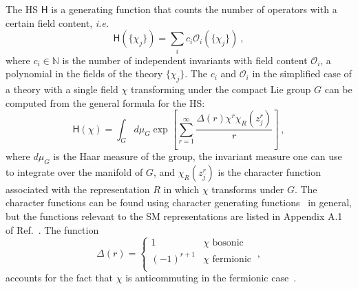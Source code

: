 The HS $\mathsf{H}$ is a generating function that counts the number of
operators with a certain field content, \textit{i.e.}
\begin{equation}
  \mathsf{H}(\{\chi_{j}\}) = \sum_{i} c_{i} \mathcal{O}_{i}(\{\chi_{j}\}) \ ,
\end{equation}
where $c_{i} \in \mathbb{N}$ is the number of independent invariants with field
content $\mathcal{O}_{i}$, a polynomial in the fields of the theory
$\{\chi_{j}\}$. The $c_{i}$ and $\mathcal{O}_{i}$ in the simplified case of a
theory with a single field $\chi$ transforming under the compact Lie group $G$
can be computed from the general formula for the HS:
\begin{equation}
  \label{eq:ch1-hs-g}
  \mathsf{H}(\chi) = \int_{G} d\mu_{G} \exp \left[ \sum_{r=1}^{\infty} \frac{\Delta(r) \chi^{r} \chi_{R}(z_{j}^{r})}{r} \right] \ ,
\end{equation}
where $d\mu_{G}$ is the Haar measure of the group, the invariant measure one can
use to integrate over the manifold of $G$, and $\chi_{R}(z_{j}^{r})$ is the
character function associated with the representation $R$ in which $\chi$
transforms under $G$. The character functions can be found using character
generating functions~\cite{Hanany:2014dia} in general, but the functions
relevant to the SM representations are listed in Appendix A.1 of
Ref.~\cite{Lehman:2015via}. The function
\begin{equation}
  \Delta(r) = \begin{cases}
    1 & \text{$\chi$ bosonic} \\
    (-1)^{r+1} & \text{$\chi$ fermionic} \\
  \end{cases} \ ,
\end{equation}
accounts for the fact that $\chi$ is anticommuting in the fermionic
case~\cite{Hanany:2014dia}.


